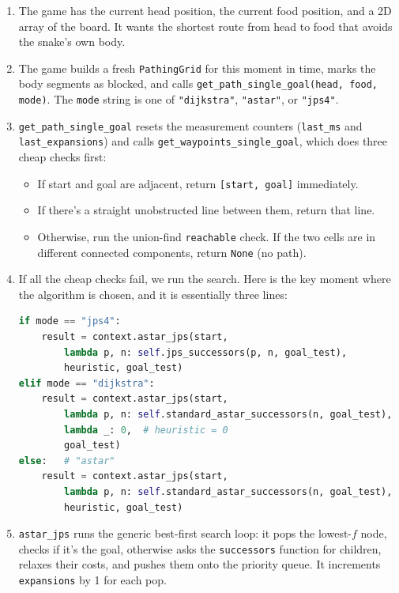 \documentclass[11pt,a4paper]{article}
\begin{document}
\begin{enumerate}[leftmargin=20pt,itemsep=3pt]
  \item The game has the current head position, the current food position, and a 2D array of the board. It wants the shortest route from head to food that avoids the snake's own body.

  \item The game builds a fresh \texttt{PathingGrid} for this moment in time, marks the body segments as blocked, and calls \texttt{get\_path\_single\_goal(head, food, mode)}. The \texttt{mode} string is one of \texttt{"dijkstra"}, \texttt{"astar"}, or \texttt{"jps4"}.

  \item \texttt{get\_path\_single\_goal} resets the measurement counters (\texttt{last\_ms} and \texttt{last\_expansions}) and calls \texttt{get\_waypoints\_single\_goal}, which does three cheap checks first:
    \begin{itemize}[leftmargin=14pt,itemsep=1pt]
      \item If start and goal are adjacent, return \texttt{[start, goal]} immediately.
      \item If there's a straight unobstructed line between them, return that line.
      \item Otherwise, run the union-find \texttt{reachable} check. If the two cells are in different connected components, return \texttt{None} (no path).
    \end{itemize}

  \item If all the cheap checks fail, we run the search. Here is the key moment where the algorithm is chosen, and it is essentially three lines:
\begin{lstlisting}[language=Python]
if mode == "jps4":
    result = context.astar_jps(start,
        lambda p, n: self.jps_successors(p, n, goal_test),
        heuristic, goal_test)
elif mode == "dijkstra":
    result = context.astar_jps(start,
        lambda p, n: self.standard_astar_successors(n, goal_test),
        lambda _: 0,  # heuristic = 0
        goal_test)
else:   # "astar"
    result = context.astar_jps(start,
        lambda p, n: self.standard_astar_successors(n, goal_test),
        heuristic, goal_test)
\end{lstlisting}

  \item \texttt{astar\_jps} runs the generic best-first search loop: it pops the lowest-$f$ node, checks if it's the goal, otherwise asks the \texttt{successors} function for children, relaxes their costs, and pushes them onto the priority queue. It increments \texttt{expansions} by 1 for each pop.


\end{enumerate}
\end{document}
